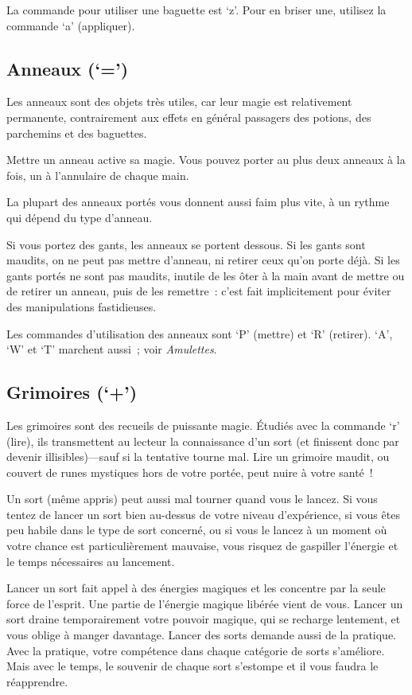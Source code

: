 \documentclass[titlepage]{article}
\begin{document}
La commande pour utiliser une baguette est `z'.
Pour en briser une, utilisez la commande `a' (appliquer).

\subsection{Anneaux (`=')}



Les anneaux sont des objets très utiles, car leur magie est relativement
permanente, contrairement aux effets en général passagers des potions,
des parchemins et des baguettes.


Mettre un anneau active sa magie.
Vous pouvez porter au plus deux anneaux à la fois, un à l'annulaire de
chaque main.


La plupart des anneaux portés vous donnent aussi faim plus vite, à un
rythme qui dépend du type d'anneau.


Si vous portez des gants, les anneaux se portent dessous.
Si les gants sont maudits, on ne peut pas mettre d'anneau, ni retirer
ceux qu'on porte déjà.
Si les gants portés ne sont pas maudits, inutile de les ôter à la main
avant de mettre ou de retirer un anneau, puis de les remettre~: c'est fait
implicitement pour éviter des manipulations fastidieuses.


Les commandes d'utilisation des anneaux sont `P' (mettre) et `R'
(retirer).
`A', `W' et `T' marchent aussi~; voir \textit{Amulettes}.

\subsection{Grimoires (`+')}



Les grimoires sont des recueils de puissante magie.
Étudiés avec la commande `r' (lire), ils transmettent au lecteur la
connaissance d'un sort (et finissent donc par devenir illisibles)---sauf si
la tentative tourne mal.
Lire un grimoire maudit, ou couvert de runes mystiques hors de votre
portée, peut nuire à votre santé~!


Un sort (même appris) peut aussi mal tourner quand vous le lancez.
Si vous tentez de lancer un sort bien au-dessus de votre niveau
d'expérience, si vous êtes peu habile dans le type de sort concerné, ou si
vous le lancez à un moment où votre chance est particulièrement mauvaise,
vous risquez de gaspiller l'énergie et le temps nécessaires au lancement.


Lancer un sort fait appel à des énergies magiques et les concentre par la
seule force de l'esprit.
Une partie de l'énergie magique libérée vient de vous.
Lancer un sort draine temporairement votre pouvoir magique, qui se
recharge lentement, et vous oblige à manger davantage.
Lancer des sorts demande aussi de la pratique.
Avec la pratique, votre compétence dans chaque catégorie de sorts
s'améliore.
Mais avec le temps, le souvenir de chaque sort s'estompe et il vous faudra
le réapprendre.
\end{document}
